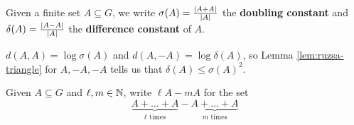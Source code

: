 \documentclass{article}
\begin{document}
\begin{dfn}
  Given a finite set $A \subseteq G$, we write $\sigma(A) = \frac{\left\lvert A + A\right\rvert}{\left\lvert A\right\rvert}$ the {\bf doubling constant} and $\delta(A) = \frac{\left\lvert A - A\right\rvert}{\left\lvert A\right\rvert}$ the {\bf difference constant} of $A$.
\end{dfn}

$d(A, A) = \log \sigma(A)$ and $d(A, -A) = \log \delta(A)$, so Lemma \ref{lem:ruzsa-triangle} for $A, -A, -A$ tells us that $\delta(A) \le \sigma(A)^2$.

\newlec

\begin{notation}
  Given $A \subseteq G$ and $\ell, m \in \mathbb N$, write $\ell A - m A$ for the set
  $$\underbrace{A + \dots + A}_{\ell \text{ times}} - \underbrace{A + \dots + A}_{m \text{ times}}$$
\end{notation}
\end{document}
